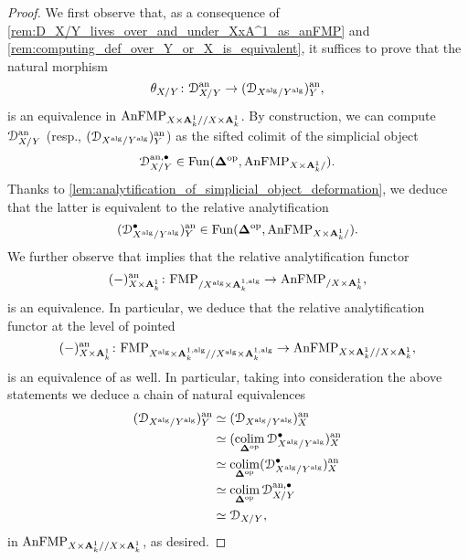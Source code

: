 \documentclass[10pt,a4paper,reqno]{amsart} %
\theoremstyle{plain}
\theoremstyle{definition}
\theoremstyle{remark}
\numberwithin{equation}{section}
\begin{document}
\begin{proof}
    
    
    
    We first observe that, as a consequence of \cref{rem:D_X/Y_lives_over_and_under_XxA^1_as_anFMP} and \cref{rem:computing_def_over_Y_or_X_is_equivalent}, it suffices to prove that the natural morphism
        \[
            \theta_{X/ Y} \colon \mathcal D^\mathrm{an}_{X/ Y} \to (\mathcal D_{X^\mathrm{alg}/ Y^\mathrm{alg}})^\mathrm{an}_Y,
        \]
    is an equivalence in $\mathrm{AnFMP}_{X \times \mathbf A^1_k/ / X \times \mathbf A^1_k}$. By construction, we can compute $\mathcal D^\mathrm{an}_{X/ Y}$ (resp., $(\mathcal D_{X^\mathrm{alg}/ Y^\mathrm{alg}}) ^\mathrm{an}_Y$)
    as the sifted colimit of the simplicial object
        \[
            \mathcal D^{\mathrm{an}, \bullet}_{X/ Y} \in \operatorname{Fun}(\bm{\Delta} ^\mathrm{op}, \mathrm{AnFMP}_{X \times \mathbf A^1_k/ }).
        \]
    Thanks to \cref{lem:analytification_of_simplicial_object_deformation}, we deduce that the latter is equivalent to the relative analytification
        \[
            (\mathcal D^\bullet_{X^\mathrm{alg}/ Y^\mathrm{alg}})^\mathrm{an}_Y \in \operatorname{Fun}(\bm{\Delta}^\mathrm{op}, \mathrm{AnFMP}_{X \times \mathbf A^1_k/ }).
        \]
    We further observe that \cite[Theorem 6.12]{Porta_Yu_NQK} implies that the relative analytification functor
        \[
            (-)^\mathrm{an}_{X \times \mathbf A^1_k} \colon \mathrm{FMP}_{ /X^\mathrm{alg} \times \mathbf A^{1, \mathrm{alg}}_k} \to \mathrm{AnFMP}_{ /X \times \mathbf A^1_k},  
        \]
    is an equivalence. In particular, we deduce that the relative analytification functor at the level of pointed \infcats
        \[
            (-)^\mathrm{an}_{X \times \mathbf A^1_k} \colon \mathrm{FMP}_{X^\mathrm{alg} \times \mathbf A^{1, \mathrm{alg}}_k/ /X^\mathrm{alg} \times \mathbf A^{1, \mathrm{alg}}_k} \to \mathrm{AnFMP}_{X \times \mathbf A^1_k/ /X \times \mathbf A^1_k}, 
        \]
    is an equivalence of \infcats as well. In particular, taking into consideration the above statements we deduce a chain of natural equivalences
        \begin{align*}
            (\mathcal D_{X^\mathrm{alg}/ Y^\mathrm{alg}})^\mathrm{an}_Y  &  \simeq (\mathcal D_{X^\mathrm{alg}/ Y^\mathrm{alg}})^\mathrm{an}_X \\
                                       &  \simeq (\operatorname*{colim}_{\bm{\Delta}^\mathrm{op}} \mathcal D_{X^\mathrm{alg}/ Y^\mathrm{alg}}^\bullet)^\mathrm{an}_X \\
                                       &  \simeq \operatorname*{colim}_{\bm{\Delta} ^\mathrm{op}} (\mathcal D_{X^\mathrm{alg}/ Y^\mathrm{alg}}^{\bullet})^\mathrm{an}_X \\
                                       &  \simeq \operatorname*{colim}_{\bm{\Delta} ^\mathrm{op}} \mathcal D_{X/ Y}^{\mathrm{an}, \bullet} \\
                                       &  \simeq \mathcal D_{X/ Y},
        \end{align*}
    in $\mathrm{AnFMP}_{X \times \mathbf A^1_k/ /X\times\mathbf A^1_k}$, as desired.
\end{proof}
\end{document}
